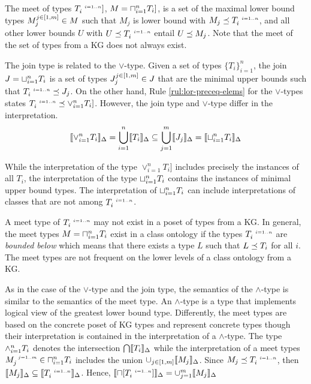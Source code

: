 \documentclass[runningheads]{llncs}
\newcommand{\s}{\scriptscriptstyle\ \,}
\newcommand{\llb}{\llbracket}
\newcommand{\rrb}{\rrbracket}
\begin{document}
The meet of types $T_i^{\s\/i=1..n}]$, $M=\sqcap_{i=1}^n\/T_i]$, is
a set of the maximal lower bound types $M_j^{j\in[1,m]}\in\/M$ such
that $M_j$ is lower bound with $M_j\preceq\/T_i^{\s\/i=1..n}$, and all
other lower bounds $U$ with $U\preceq\/T_i^{\s\/i=1..n}$ entail
$U\preceq\/M_j$. Note that the meet of the set of types from a KG does
not always exist.

The join type is related to the $\lor$-type. Given a set of types
$\{T_i\}_{i=1}^n$, the join $J=\sqcup_{i=1}^n\/T_i$ is a set of types
$J_j^{j\in[1,m]}\in\/J$ that are the minimal upper bounds such that
$T_i^{\s\/i=1..n}\preceq\/J_j$. On the other hand, Rule
\ref{rul:lor-preceq-elems} for the $\lor$-types states
$T_i^{\s\/i=1..n}\preceq\lor_{i=1}^n\/T_i]$. However, the join type and $\lor$-type
differ in the interpretation.
$$\llb\lor_{i=1}^n\/T_i\rrb_\D=\bigcup_{i=1}^n\llb\/T_i\rrb_\D\subseteq\bigcup_{j=1}^m\llb\/J_j\rrb_\D=\llb\sqcup_{i=1}^n\/T_i\rrb_\D$$

While the interpretation of the type $\lor_{i=1}^nT_i]$ includes
precisely the instances of all $T_i$, the interpretation of the type
$\sqcup_{i=1}^n\/T_i$ contains the instances of minimal upper bound
types. The interpretation of $\sqcup_{i=1}^n\/T_i$ can include
interpretations of classes that are not among $T_i^{\s\/i=1..n}$.

A meet type of $T_i^{\s\/i=1..n}$ may not exist in a poset of types
from a KG. In general, the meet types $M=\sqcap_{i=1}^n\/T_i$
exist in a class ontology if the types $T_i^{\s\/i=1..n}$ are
\emph{bounded below} \cite{Pierce2002} which means that there exists a
type $L$ such that $L\preceq\/T_i$ for all $i$. The meet types are not
frequent on the lower levels of a class ontology from a KG.

As in the case of the $\lor$-type and the join type, the semantics of
the $\land$-type is similar to the semantics of the meet type. An
$\land$-type is a type that implements logical view of the greatest
lower bound type. Differently, the meet types are based on the
concrete poset of KG types and represent concrete types though their
interpretation is contained in the interpretation of a
$\land$-type. The type $\land_{i=1}^n\/T_i$ denotes the intersection
$\bigcap\/\llb\/T_i\rrb_\D$ while the interpretation of a meet types
$M_j^{\s\/j=1..m}\in\sqcap_{i=1}^n\/T_i$ includes the union
$\cup_{j\in[1,m]}\llb\/M_j\rrb_\D$. Since
$M_j\preceq\/T_i^{\s\/i=1..n}$, then
$\llb\/M_j\rrb_\D\subseteq\llb\/T_i^{\s\/i=1..n}\rrb_\D$. Hence,
$\llb\sqcap[T_i^{\s\/i=1..n}]\rrb_\D=\cup_{j=1}^m\llb\/M_j\rrb_\D$
\end{document}
